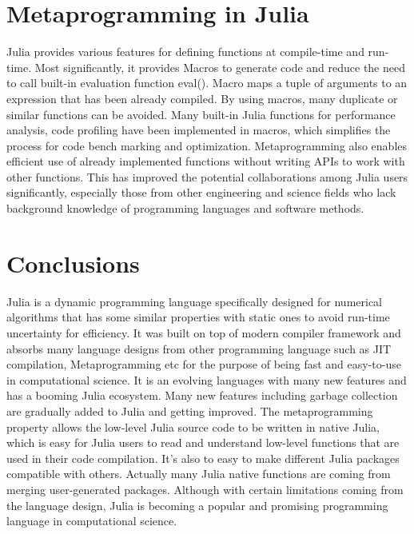 \documentclass[11pt]{article}
\begin{document}
\section{Metaprogramming in Julia}
Julia provides various features for defining functions at compile-time and run-time. Most significantly, it provides Macros to generate code and reduce the need to call built-in evaluation function eval(). Macro maps a tuple of arguments to an expression that has been already compiled. By using macros, many duplicate or similar functions can be avoided. Many built-in Julia functions for performance analysis, code profiling have been implemented in macros, which simplifies the process for code bench marking and optimization. Metaprogramming also enables efficient use of already implemented functions without writing APIs to work with other functions. This has improved the potential collaborations among Julia users significantly, especially those from other engineering and science fields who lack background knowledge of programming languages and software methods. 



\section{Conclusions}\label{sec:Conclusions}

Julia is a dynamic programming language specifically designed for numerical algorithms that has some similar properties with static ones to avoid run-time uncertainty for efficiency. It was built on top of modern compiler framework and absorbs many language designs from other programming language such as JIT compilation, Metaprogramming etc for the purpose of being fast and easy-to-use in computational science. It is an evolving languages with many new features and has a booming Julia ecosystem. Many new features including garbage collection are gradually added to Julia and getting improved. The metaprogramming property allows the low-level Julia source code to be written in native Julia, which is easy for Julia users to read and understand low-level functions that are used in their code compilation. It's also to easy to make different Julia packages compatible with others. Actually many Julia native functions are coming from merging user-generated packages. Although with certain limitations coming from the language design, Julia is becoming a popular and promising programming language in computational science.






\end{document}
